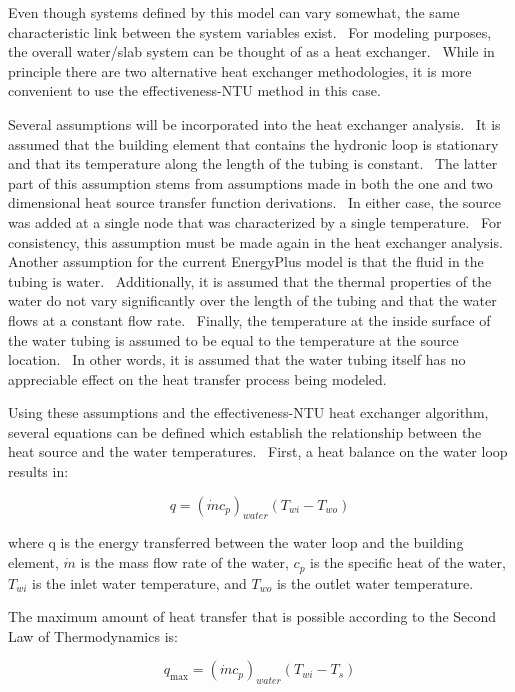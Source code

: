 Even though systems defined by this model can vary somewhat, the same characteristic link between the system variables exist.~ For modeling purposes, the overall water/slab system can be thought of as a heat exchanger.~ While in principle there are two alternative heat exchanger methodologies, it is more convenient to use the effectiveness-NTU method in this case.

Several assumptions will be incorporated into the heat exchanger analysis.~ It is assumed that the building element that contains the hydronic loop is stationary and that its temperature along the length of the tubing is constant.~ The latter part of this assumption stems from assumptions made in both the one and two dimensional heat source transfer function derivations.~ In either case, the source was added at a single node that was characterized by a single temperature.~ For consistency, this assumption must be made again in the heat exchanger analysis.~ Another assumption for the current EnergyPlus model is that the fluid in the tubing is water.~ Additionally, it is assumed that the thermal properties of the water do not vary significantly over the length of the tubing and that the water flows at a constant flow rate.~ Finally, the temperature at the inside surface of the water tubing is assumed to be equal to the temperature at the source location.~ In other words, it is assumed that the water tubing itself has no appreciable effect on the heat transfer process being modeled.

Using these assumptions and the effectiveness-NTU heat exchanger algorithm, several equations can be defined which establish the relationship between the heat source and the water temperatures.~ First, a heat balance on the water loop results in:

\begin{equation}
q = {\left( {\dot m{c_p}} \right)_{water}}\left( {{T_{wi}} - {T_{wo}}} \right)
\label{eq:RadSysHX673}
\end{equation}

where q is the energy transferred between the water loop and the building element, \(\dot m\) is the mass flow rate of the water, \(c_p\) is the specific heat of the water, \(T_{wi}\) is the inlet water temperature, and \(T_{wo}\) is the outlet water temperature.

The maximum amount of heat transfer that is possible according to the Second Law of Thermodynamics is:

\begin{equation}
{q_{\max }} = {\left( {\dot m{c_p}} \right)_{water}}\left( {{T_{wi}} - {T_s}} \right)
\label{eq:RadSysHX674}
\end{equation}

